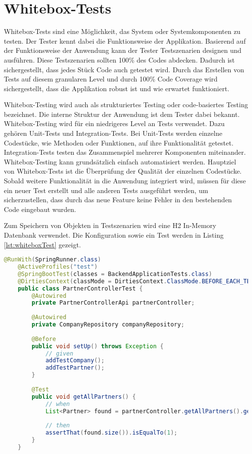 \section{Whitebox-Tests}
Whitebox-Tests sind eine Möglichkeit, das System oder Systemkomponenten zu testen. Der Tester kennt dabei die Funktionsweise der Applikation. Basierend auf der Funktionsweise der Anwendung kann der Tester Testszenarien designen und ausführen. Diese Testszenarien sollten 100\% des Codes abdecken. Dadurch ist sichergestellt, dass jedes Stück Code auch getestet wird. Durch das Erstellen von Tests auf diesem granularen Level und durch 100\% Code Coverage wird sichergestellt, dass die Applikation robust ist und wie erwartet funktioniert.

Whitebox-Testing wird auch als strukturiertes Testing oder code-basiertes Testing bezeichnet. Die interne Struktur der Anwendung ist dem Tester dabei bekannt. Whitebox-Testing wird für ein niedrigeres Level an Tests verwendet. Dazu gehören Unit-Tests und Integration-Tests. Bei Unit-Tests werden einzelne Codestücke, wie Methoden oder Funktionen, auf ihre Funktionalität getestet. Integration-Tests testen das Zusammenspiel mehrerer Komponenten miteinander. Whitebox-Testing kann grundsätzlich einfach automatisiert werden. Hauptziel von Whitebox-Tests ist die Überprüfung der Qualität der einzelnen Codestücke.
Sobald weitere Funktionalität in die Anwendung integriert wird, müssen für diese ein neuer Test erstellt und alle anderen Tests ausgeführt werden, um sicherzustellen, dass durch das neue Feature keine Fehler in den bestehenden Code eingebaut wurden.

Zum Speichern von Objekten in Testszenarien wird eine H2 In-Memory Datenbank verwendet.
Die Konfiguration sowie ein Test werden in Listing \ref{lst:whiteboxTest} gezeigt.

\begin{lstlisting}[language=java, caption=PartnerControllerTest.java, label=lst:whiteboxTest]
	@RunWith(SpringRunner.class)
	@ActiveProfiles("test")
	@SpringBootTest(classes = BackendApplicationTests.class)
	@DirtiesContext(classMode = DirtiesContext.ClassMode.BEFORE_EACH_TEST_METHOD)
	public class PartnerControllerTest {
		@Autowired
		private PartnerControllerApi partnerController;
		
		@Autowired
		private CompanyRepository companyRepository;
		
		@Before
		public void setUp() throws Exception {
			// given
			addTestCompany();
			addTestPartner();
		}
		
		@Test
		public void getAllPartners() {
			// when
			List<Partner> found = partnerController.getAllPartners().getBody();
			
			// then
			assertThat(found.size()).isEqualTo(1);
		}
	}
\end{lstlisting}

